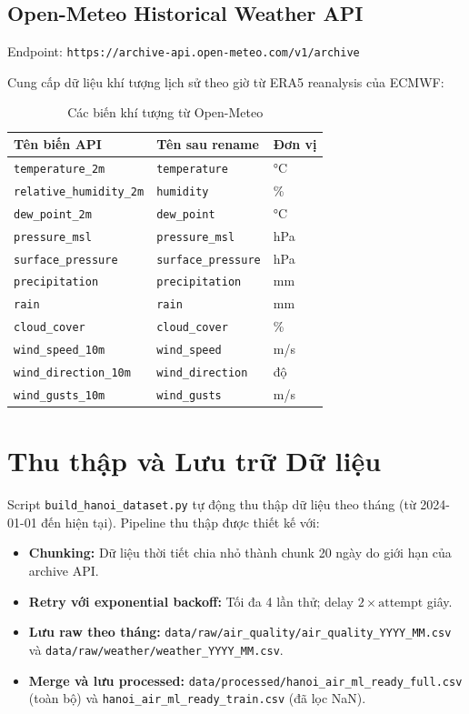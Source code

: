 \documentclass[12pt,a4paper]{report}
\begin{document}
\subsection{Open-Meteo Historical Weather API}

Endpoint: \texttt{https://archive-api.open-meteo.com/v1/archive}

Cung cấp dữ liệu khí tượng lịch sử theo giờ từ ERA5 reanalysis của ECMWF:

\begin{table}[H]
\centering
\caption{Các biến khí tượng từ Open-Meteo}
\label{tab:weather_vars}
\begin{tabular}{lll}
\toprule
\textbf{Tên biến API} & \textbf{Tên sau rename} & \textbf{Đơn vị} \\
\midrule
\texttt{temperature\_2m}       & \texttt{temperature}   & °C \\
\texttt{relative\_humidity\_2m}& \texttt{humidity}      & \% \\
\texttt{dew\_point\_2m}        & \texttt{dew\_point}    & °C \\
\texttt{pressure\_msl}         & \texttt{pressure\_msl} & hPa \\
\texttt{surface\_pressure}     & \texttt{surface\_pressure} & hPa \\
\texttt{precipitation}         & \texttt{precipitation} & mm \\
\texttt{rain}                  & \texttt{rain}          & mm \\
\texttt{cloud\_cover}          & \texttt{cloud\_cover}  & \% \\
\texttt{wind\_speed\_10m}      & \texttt{wind\_speed}   & m/s \\
\texttt{wind\_direction\_10m}  & \texttt{wind\_direction} & độ \\
\texttt{wind\_gusts\_10m}      & \texttt{wind\_gusts}   & m/s \\
\bottomrule
\end{tabular}
\end{table}

\section{Thu thập và Lưu trữ Dữ liệu}

Script \texttt{build\_hanoi\_dataset.py} tự động thu thập dữ liệu theo tháng (từ 2024-01-01 đến hiện tại). Pipeline thu thập được thiết kế với:

\begin{itemize}
  \item \textbf{Chunking:} Dữ liệu thời tiết chia nhỏ thành chunk 20 ngày do giới hạn của archive API.
  \item \textbf{Retry với exponential backoff:} Tối đa 4 lần thử; delay $2 \times \text{attempt}$ giây.
  \item \textbf{Lưu raw theo tháng:} \texttt{data/raw/air\_quality/air\_quality\_YYYY\_MM.csv} và \texttt{data/raw/weather/weather\_YYYY\_MM.csv}.
  \item \textbf{Merge và lưu processed:} \texttt{data/processed/hanoi\_air\_ml\_ready\_full.csv} (toàn bộ) và \texttt{hanoi\_air\_ml\_ready\_train.csv} (đã lọc NaN).
\end{itemize}
\end{document}
